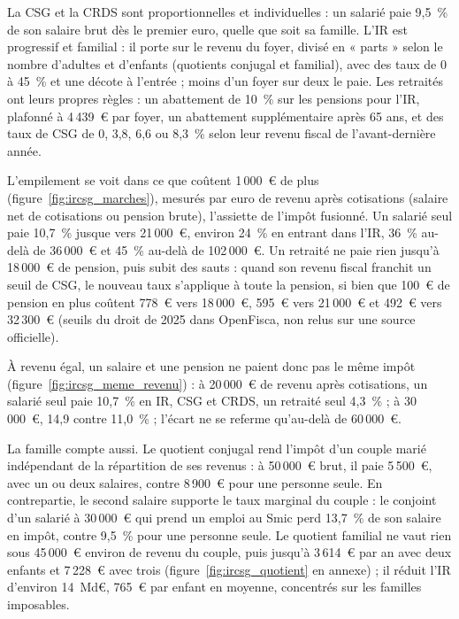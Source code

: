 La CSG et la CRDS sont proportionnelles et individuelles : un salarié paie 9,5~\% de son salaire brut dès le premier
euro, quelle que soit sa famille. L'IR est progressif et familial : il porte sur le revenu du foyer, divisé en « parts »
selon le nombre d'adultes et d'enfants (quotients conjugal et familial), avec des taux de 0 à 45~\% et une décote à
l'entrée ; moins d'un foyer sur deux le paie. Les retraités ont leurs propres règles : un abattement de 10~\% sur les
pensions pour l'IR, plafonné à 4\,439~€ par foyer, un abattement supplémentaire après 65 ans, et des taux de CSG de 0,
3,8, 6,6 ou 8,3~\% selon leur revenu fiscal de l'avant-dernière année.

L'empilement se voit dans ce que coûtent 1\,000~€ de plus (figure~\ref{fig:ircsg_marches}), mesurés par euro de revenu
après cotisations (salaire net de cotisations ou pension brute), l'assiette de l'impôt fusionné. Un salarié seul paie
10,7~\% jusque vers 21\,000~€, environ 24~\% en entrant dans l'IR, 36~\% au-delà de 36\,000~€ et 45~\% au-delà de
102\,000~€. Un retraité ne paie rien jusqu'à 18\,000~€ de pension, puis subit des sauts : quand son revenu fiscal
franchit un seuil de CSG, le nouveau taux s'applique à toute la pension, si bien que 100~€ de pension en plus coûtent
778~€ vers 18\,000~€, 595~€ vers 21\,000~€ et 492~€ vers 32\,300~€ (seuils du droit de 2025 dans OpenFisca, non relus
sur une source officielle).


À revenu égal, un salaire et une pension ne paient donc pas le même impôt (figure~\ref{fig:ircsg_meme_revenu}) : à
20\,000~€ de revenu après cotisations, un salarié seul paie 10,7~\% en IR, CSG et CRDS, un retraité seul 4,3~\% ; à
30\,000~€, 14,9 contre 11,0~\% ; l'écart ne se referme qu'au-delà de 60\,000~€.


La famille compte aussi. Le quotient conjugal rend l'impôt d'un couple marié indépendant de la répartition de ses
revenus : à 50\,000~€ brut, il paie 5\,500~€, avec un ou deux salaires, contre 8\,900~€ pour une personne seule. En
contrepartie, le second salaire supporte le taux marginal du couple : le conjoint d'un salarié à 30\,000~€ qui prend un
emploi au Smic perd 13,7~\% de son salaire en impôt, contre 9,5~\% pour une personne seule. Le quotient familial ne vaut
rien sous 45\,000~€ environ de revenu du couple, puis jusqu'à 3\,614~€ par an avec deux enfants et 7\,228~€ avec trois
(figure~\ref{fig:ircsg_quotient} en annexe) ; il réduit l'IR d'environ 14~Md€, 765~€ par enfant en moyenne, concentrés
sur les familles imposables.


